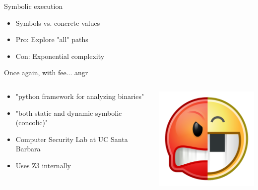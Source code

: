 \documentclass[10pt, compress]{beamer}
\begin{document}
\begin{frame}{Symbolic execution}
  \begin{itemize}
    \item Symbols vs. concrete values
    \item Pro: Explore "all" paths
    \item Con: Exponential complexity
  \end{itemize}
\end{frame}

\begin{frame}{Once again, with fee... angr}

  \begin{columns}
    \begin{column}{0.75\textwidth}
  
    \begin{itemize}
    \item "python framework for analyzing binaries"
    \item "both static and dynamic symbolic (concolic)"
    \item Computer Security Lab at UC Santa Barbara
    \item Uses Z3 internally
    \end{itemize}
  \end{column}
    \begin{column}{0.25\textwidth}
      \includegraphics[width=\textwidth]{images/angr-logo.png}
    \end{column}
  \end{columns} 

\end{frame}
\end{document}
